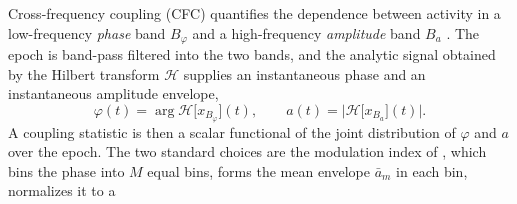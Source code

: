 %
%
%
%
%
%
Cross-frequency coupling (CFC) quantifies the dependence between activity
in a low-frequency \emph{phase} band $B_{\varphi}$ and a high-frequency
\emph{amplitude} band $B_{a}$ \citep{canolty2010}. The epoch is band-pass
filtered into the two bands, and the analytic signal obtained by the
Hilbert transform $\mathcal{H}$ supplies an instantaneous phase and an
instantaneous amplitude envelope,
%
\begin{equation}
\label{eq:analytic}
\varphi(t) = \arg \mathcal{H}\big[x_{B_{\varphi}}\big](t),
\qquad
a(t) = \big| \mathcal{H}\big[x_{B_{a}}\big](t) \big|.
\end{equation}
%
A coupling statistic is then a scalar functional of the joint distribution
of $\varphi$ and $a$ over the epoch. The two standard choices are the
modulation index of \citet{tort2010}, which bins the phase into $M$ equal
bins, forms the mean envelope $\bar{a}_m$ in each bin, normalizes it to a
